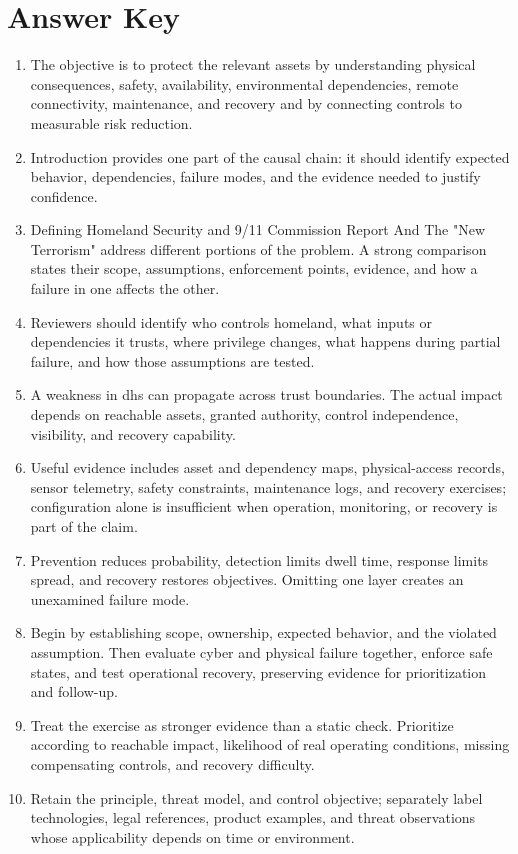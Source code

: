 \documentclass[11pt,letterpaper]{article}
\begin{document}
\section*{Answer Key}
\begin{enumerate}
\item The objective is to protect the relevant assets by understanding physical consequences, safety, availability, environmental dependencies, remote connectivity, maintenance, and recovery and by connecting controls to measurable risk reduction.
\item Introduction provides one part of the causal chain: it should identify expected behavior, dependencies, failure modes, and the evidence needed to justify confidence.
\item Defining Homeland Security and 9/11 Commission Report And The "New Terrorism" address different portions of the problem. A strong comparison states their scope, assumptions, enforcement points, evidence, and how a failure in one affects the other.
\item Reviewers should identify who controls homeland, what inputs or dependencies it trusts, where privilege changes, what happens during partial failure, and how those assumptions are tested.
\item A weakness in dhs can propagate across trust boundaries. The actual impact depends on reachable assets, granted authority, control independence, visibility, and recovery capability.
\item Useful evidence includes asset and dependency maps, physical-access records, sensor telemetry, safety constraints, maintenance logs, and recovery exercises; configuration alone is insufficient when operation, monitoring, or recovery is part of the claim.
\item Prevention reduces probability, detection limits dwell time, response limits spread, and recovery restores objectives. Omitting one layer creates an unexamined failure mode.
\item Begin by establishing scope, ownership, expected behavior, and the violated assumption. Then evaluate cyber and physical failure together, enforce safe states, and test operational recovery, preserving evidence for prioritization and follow-up.
\item Treat the exercise as stronger evidence than a static check. Prioritize according to reachable impact, likelihood of real operating conditions, missing compensating controls, and recovery difficulty.
\item Retain the principle, threat model, and control objective; separately label technologies, legal references, product examples, and threat observations whose applicability depends on time or environment.
\end{enumerate}
\end{document}
